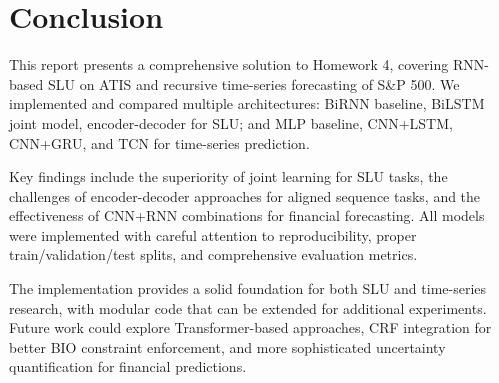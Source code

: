 \documentclass[conference]{IEEEtran}
\begin{document}
\section{Conclusion}
This report presents a comprehensive solution to Homework 4, covering RNN-based SLU on ATIS and recursive time-series forecasting of S\&P 500. We implemented and compared multiple architectures: BiRNN baseline, BiLSTM joint model, encoder-decoder for SLU; and MLP baseline, CNN+LSTM, CNN+GRU, and TCN for time-series prediction.

Key findings include the superiority of joint learning for SLU tasks, the challenges of encoder-decoder approaches for aligned sequence tasks, and the effectiveness of CNN+RNN combinations for financial forecasting. All models were implemented with careful attention to reproducibility, proper train/validation/test splits, and comprehensive evaluation metrics.

The implementation provides a solid foundation for both SLU and time-series research, with modular code that can be extended for additional experiments. Future work could explore Transformer-based approaches, CRF integration for better BIO constraint enforcement, and more sophisticated uncertainty quantification for financial predictions.
\end{document}
